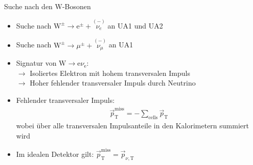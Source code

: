 \documentclass[aspectratio=1610, professionalfonts, 10pt]{beamer}
\begin{document}
\begin{frame}{Suche nach den W-Bosonen}
			\begin{itemize}
				\setlength\itemsep{0.5em}
				\item Suche nach $\text{W}^{\pm} \rightarrow \text{e}^{\pm} + \overset{(-)}{\nu_e}$ an UA1 und UA2
				\item Suche nach $\text{W}^{\pm} \rightarrow \mu^{\pm} + \overset{(-)}{\nu_\mu}$ an UA1
				\item Signatur von $\text{W} \rightarrow \text{e} \nu_\text{e}$:\\
				$\rightarrow$ Isoliertes Elektron mit hohem transversalen Impuls \\
				$\rightarrow$ Hoher fehlender transversaler Impuls durch Neutrino
				\item Fehlender transversaler Impuls:
				\begin{align*}
					\vec{p}_\text{T}^\text{miss} = - \sum_{\text{cells}} \vec{p}_\text{T}
				\end{align*}
				wobei über alle transversalen Impulsanteile in den Kalorimetern summiert wird
				\item Im idealen Detektor gilt: $\vec{p}_\text{T}^\text{miss} = \vec{p}_{\nu, \text{T}}$
			\end{itemize}

\end{frame}
\end{document}
